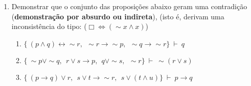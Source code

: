 \documentclass[12pt, a4paper,final]{article}
\begin{document}
\begin{enumerate}
\begin{enumerate}
\end{enumerate}


\item  Demonstrar que o conjunto das proposi\c c\~oes abaixo geram uma contradi\c c\~ao ({\bf demons\-tra\c c\~ao por absurdo ou indireta}),  (isto \'e, derivam uma inconsist\^encia do tipo: ($\Box \Leftrightarrow (\sim x \wedge x)$)


\begin{enumerate}







\item $\{\ (p \wedge q) \leftrightarrow \sim r, \:\:  \sim r \rightarrow \sim p, \:\: \sim q \rightarrow \sim r   \} ~\vdash~   q $

\item $\{\ \sim p \vee \sim  q,\:\:  r \vee s \rightarrow p,\:\:  q \vee \sim s,\:\: \sim r  \} ~\vdash~   \sim (r \vee s) $


\item $\{\ (p \rightarrow q) \vee r,\:\:  s \vee t \rightarrow \sim r,\:\:  s \vee (t \wedge u)  \} ~\vdash~   p \rightarrow q $







\end{enumerate}
\end{enumerate}
\end{document}
